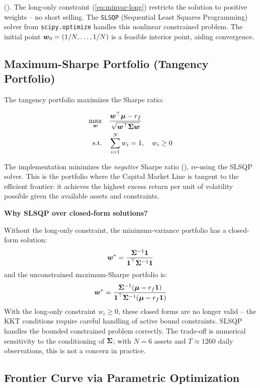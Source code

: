 (). The long-only constraint (\ref{eq:minvar-long}) restricts the solution to positive weights -- no short selling. The \texttt{SLSQP} (Sequential Least Squares Programming) solver from \texttt{scipy.optimize} handles this nonlinear constrained problem. The initial point $\boldsymbol{w}_0 = (1/N, \ldots, 1/N)$ is a feasible interior point, aiding convergence.

\subsection{Maximum-Sharpe Portfolio (Tangency Portfolio)}

The tangency portfolio maximizes the Sharpe ratio:

\begin{align}
  \max_{\boldsymbol{w}} \quad & \frac{\boldsymbol{w}^{\top}\boldsymbol{\mu} - r_f}{\sqrt{\boldsymbol{w}^{\top}\mathbf{\Sigma}\boldsymbol{w}}} \label{eq:maxsharpe-obj} \\
  \text{s.t.} \quad & \sum_{i=1}^{N} w_i = 1, \quad w_i \geq 0
\end{align}

The implementation minimizes the \emph{negative} Sharpe ratio (), re-using the SLSQP solver. This is the portfolio where the Capital Market Line is tangent to the efficient frontier: it achieves the highest excess return per unit of volatility possible given the available assets and constraints.

\begin{decisionbox}
  \textbf{Why SLSQP over closed-form solutions?}

  Without the long-only constraint, the minimum-variance portfolio has a closed-form solution:
  \[
    \boldsymbol{w}^* = \frac{\mathbf{\Sigma}^{-1}\boldsymbol{1}}{\boldsymbol{1}^{\top}\mathbf{\Sigma}^{-1}\boldsymbol{1}}
  \]
  and the unconstrained maximum-Sharpe portfolio is:
  \[
    \boldsymbol{w}^* = \frac{\mathbf{\Sigma}^{-1}(\boldsymbol{\mu} - r_f\boldsymbol{1})}{\boldsymbol{1}^{\top}\mathbf{\Sigma}^{-1}(\boldsymbol{\mu} - r_f\boldsymbol{1})}
  \]
  With the long-only constraint $w_i \geq 0$, these closed forms are no longer valid -- the KKT conditions require careful handling of active bound constraints. SLSQP handles the bounded constrained problem correctly. The trade-off is numerical sensitivity to the conditioning of $\mathbf{\Sigma}$; with $N = 6$ assets and $T \approx 1260$ daily observations, this is not a concern in practice.
\end{decisionbox}

\subsection{Frontier Curve via Parametric Optimization}

